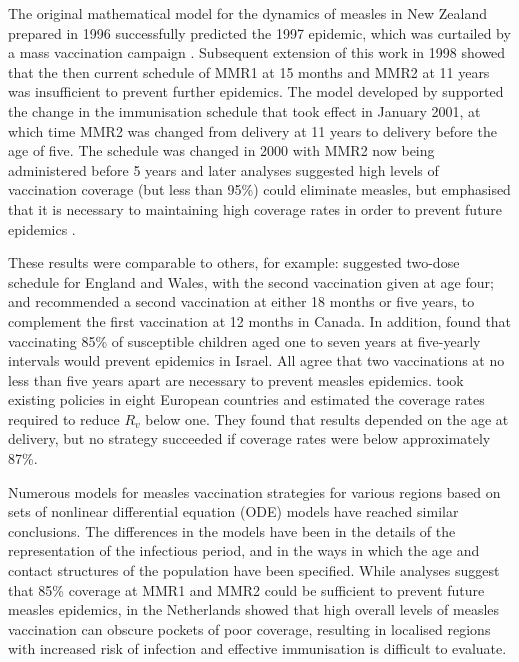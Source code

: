 \documentclass{article}
\begin{document}
{The original mathematical model for the dynamics of measles in New Zealand prepared in 1996 \citep{tobias98} successfully predicted the 1997 epidemic, which was curtailed by a mass vaccination campaign \citep{mansoor98,roberts0}. Subsequent extension of this work in 1998 showed that the then current schedule of MMR1 at 15 months and MMR2 at 11 years was insufficient to prevent further epidemics. The model developed by \citep{roberts0} supported the change in the immunisation schedule that took effect in January 2001, at which time MMR2 was changed from delivery at 11 years to delivery before the age of five. The schedule was changed in 2000 with MMR2 now being administered before 5 years \citep{anon2a} and later analyses suggested high levels of vaccination coverage (but less than 95\%) could eliminate measles, but emphasised that it is necessary to maintaining high coverage rates in order to prevent future epidemics \citep{roberts4}.

These results were comparable to others, for example: \citep{babad95} suggested two-dose schedule for England and Wales, with the second vaccination given at age four; and \citep{gay98} recommended a second vaccination at either 18 months or five years, to complement the first vaccination at 12 months in Canada. In addition, \citep{agur93} found that vaccinating 85\% of susceptible children aged one to seven years at five-yearly intervals would prevent epidemics in Israel. All agree that two vaccinations at no less than five years apart are necessary to prevent measles epidemics. \citep{wallinga1} took existing policies in eight European countries and estimated the coverage rates required to reduce $R_v$ below one. They found that results depended on the age at delivery, but no strategy succeeded if coverage rates were below approximately 87\%.

Numerous models for measles vaccination strategies for various regions \citep{agur93, babad95, edmunds0, gay98, wallinga1} based on sets of nonlinear differential equation (ODE) models have reached similar conclusions. The differences in the models have been in the details of the representation of the infectious period, and in the ways in which the age and contact structures of the population have been specified. While analyses suggest that 85\% coverage at MMR1 and MMR2 could be sufficient to prevent future measles epidemics, \citep{glass4} in the Netherlands showed that high overall levels of measles vaccination can obscure pockets of poor coverage, resulting in localised regions with increased risk of infection and effective immunisation is difficult to evaluate. 

}
\end{document}
